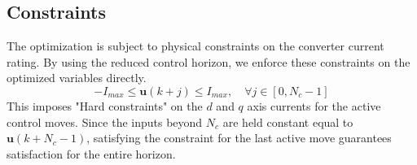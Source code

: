\subsection{Constraints}
The optimization is subject to physical constraints on the converter current rating. By using the reduced control horizon, we enforce
these constraints on the optimized variables directly.
\begin{equation}
    -I_{max} \leq \mathbf{u}(k+j) \leq I_{max}, \quad \forall j \in [0, N_c-1]
    \label{eq:control_input_constraint}
\end{equation}
This imposes "Hard constraints" on the $d$ and $q$ axis currents for the active control moves. Since the inputs beyond $N_c$ are
held constant equal to $\mathbf{u}(k+N_c-1)$, satisfying the constraint for the last active move guarantees satisfaction for the entire horizon.\par
